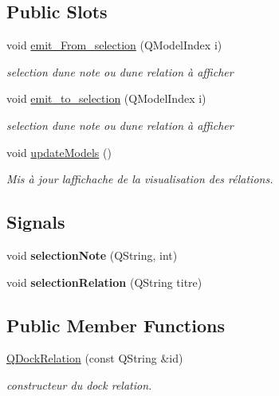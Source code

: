 \subsection*{Public Slots}
\begin{DoxyCompactItemize}
\item 
void \hyperlink{class_q_dock_relation_a6072a6081826939baded79153ecbf341}{emit\+\_\+\+From\+\_\+selection} (Q\+Model\+Index i)
\begin{DoxyCompactList}\small\item\em selection d\textquotesingle{}une note ou d\textquotesingle{}une relation à afficher \end{DoxyCompactList}\item 
void \hyperlink{class_q_dock_relation_aeb73f1a25957fb93815d3a47e1eed931}{emit\+\_\+to\+\_\+selection} (Q\+Model\+Index i)
\begin{DoxyCompactList}\small\item\em selection d\textquotesingle{}une note ou d\textquotesingle{}une relation à afficher \end{DoxyCompactList}\item 
\mbox{\label{class_q_dock_relation_a3d3bd086c56c255eca9e0991359f0f84}} 
void \hyperlink{class_q_dock_relation_a3d3bd086c56c255eca9e0991359f0f84}{update\+Models} ()
\begin{DoxyCompactList}\small\item\em Mis à jour l\textquotesingle{}affichache de la visualisation des rélations. \end{DoxyCompactList}\end{DoxyCompactItemize}
\subsection*{Signals}
\begin{DoxyCompactItemize}
\item 
\mbox{\label{class_q_dock_relation_a8e6f45fa1d280057fba260274385b8b1}} 
void {\bfseries selection\+Note} (Q\+String, int)
\item 
\mbox{\label{class_q_dock_relation_a00c9f94b747cb5e552db374bf9c1781c}} 
void {\bfseries selection\+Relation} (Q\+String titre)
\end{DoxyCompactItemize}
\subsection*{Public Member Functions}
\begin{DoxyCompactItemize}
\item 
\hyperlink{class_q_dock_relation_a3cef55579cbcd3a665253b62876f69dc}{Q\+Dock\+Relation} (const Q\+String \&id)
\begin{DoxyCompactList}\small\item\em constructeur du dock relation. \end{DoxyCompactList}\end{DoxyCompactItemize}


